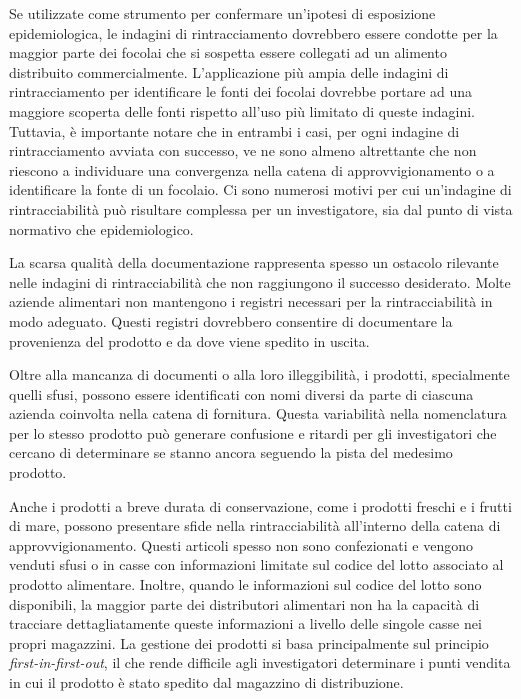 Se utilizzate come strumento per confermare un'ipotesi di esposizione epidemiologica, le indagini di rintracciamento dovrebbero essere condotte per la maggior parte dei focolai che si sospetta essere collegati ad un alimento distribuito commercialmente. L'applicazione più ampia delle indagini di rintracciamento per identificare le fonti dei focolai dovrebbe portare ad una maggiore scoperta delle fonti rispetto all'uso più limitato di queste indagini. Tuttavia, è importante notare che in entrambi i casi, per ogni indagine di rintracciamento avviata con successo, ve ne sono almeno altrettante che non riescono a individuare una convergenza nella catena di approvvigionamento o a identificare la fonte di un focolaio. Ci sono numerosi motivi per cui un'indagine di rintracciabilità può risultare complessa per un investigatore, sia dal punto di vista normativo che epidemiologico.

La scarsa qualità della documentazione rappresenta spesso un ostacolo rilevante nelle indagini di rintracciabilità che non raggiungono il successo desiderato. Molte aziende alimentari non mantengono i registri necessari per la rintracciabilità in modo adeguato. Questi registri dovrebbero consentire di documentare la provenienza del prodotto e da dove viene spedito in uscita.

Oltre alla mancanza di documenti o alla loro illeggibilità, i prodotti, specialmente quelli sfusi, possono essere identificati con nomi diversi da parte di ciascuna azienda coinvolta nella catena di fornitura. Questa variabilità nella nomenclatura per lo stesso prodotto può generare confusione e ritardi per gli investigatori che cercano di determinare se stanno ancora seguendo la pista del medesimo prodotto.

Anche i prodotti a breve durata di conservazione, come i prodotti freschi e i frutti di mare, possono presentare sfide nella rintracciabilità all'interno della catena di approvvigionamento. Questi articoli spesso non sono confezionati e vengono venduti sfusi o in casse con informazioni limitate sul codice del lotto associato al prodotto alimentare. Inoltre, quando le informazioni sul codice del lotto sono disponibili, la maggior parte dei distributori alimentari non ha la capacità di tracciare dettagliatamente queste informazioni a livello delle singole casse nei propri magazzini. La gestione dei prodotti si basa principalmente sul principio \textit{first-in-first-out}, il che rende difficile agli investigatori determinare i punti vendita in cui il prodotto è stato spedito dal magazzino di distribuzione.

